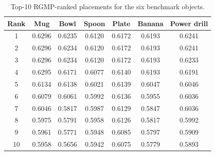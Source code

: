 \begin{table}[t]
\centering
\caption{Top-10 RGMP-ranked placements for the six benchmark objects.}
\label{tab:top10-gfi}
\renewcommand{\arraystretch}{1.1}
\begin{tabular}{ccccccc}
\hline
Rank & Mug & Bowl & Spoon & Plate & Banana & Power drill \\
\hline
1 & 0.6296 & 0.6235 & 0.6120 & 0.6172 & 0.6193 & 0.6241 \\
2 & 0.6296 & 0.6234 & 0.6120 & 0.6172 & 0.6193 & 0.6241 \\
3 & 0.6296 & 0.6234 & 0.6120 & 0.6172 & 0.6193 & 0.6233 \\
4 & 0.6295 & 0.6171 & 0.6077 & 0.6140 & 0.6193 & 0.6191 \\
5 & 0.6134 & 0.6138 & 0.6021 & 0.6139 & 0.6047 & 0.6046 \\
6 & 0.6079 & 0.6061 & 0.5992 & 0.6136 & 0.5955 & 0.6036 \\
7 & 0.6046 & 0.5817 & 0.5987 & 0.6129 & 0.5847 & 0.6036 \\
8 & 0.5975 & 0.5791 & 0.5958 & 0.6126 & 0.5817 & 0.5992 \\
9 & 0.5961 & 0.5771 & 0.5948 & 0.6085 & 0.5797 & 0.5909 \\
10 & 0.5958 & 0.5656 & 0.5942 & 0.6075 & 0.5779 & 0.5893 \\
\hline
\end{tabular}
\end{table}
